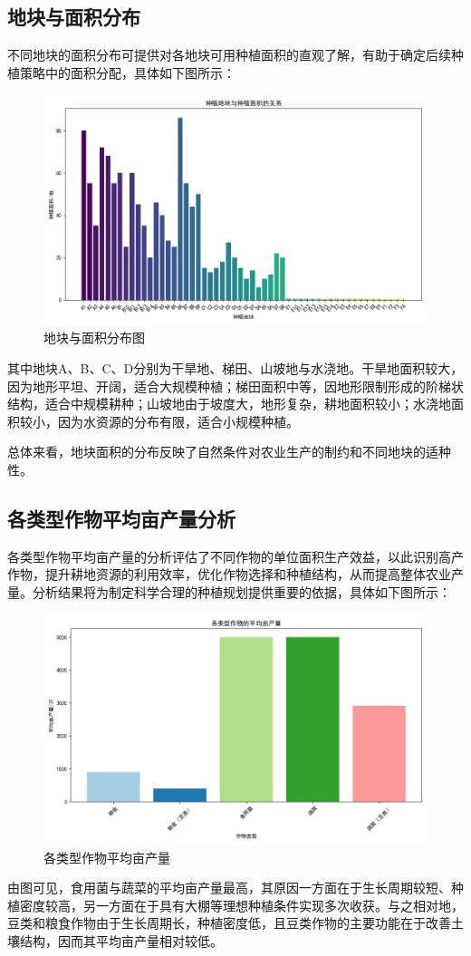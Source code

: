\documentclass{cumcmthesis}
\begin{document}
\subsection{地块与面积分布}
不同地块的面积分布可提供对各地块可用种植面积的直观了解，有助于确定后续种植策略中的面积分配，具体如下图所示：
\begin{figure}[H]
    \centering
    \includegraphics[width=.9\textwidth]{Figure_1.png}
    \caption{地块与面积分布图}
    \label{fig:region_area}
\end{figure}
其中地块A、B、C、D分别为干旱地、梯田、山坡地与水浇地。干旱地面积较大，因为地形平坦、开阔，适合大规模种植；梯田面积中等，因地形限制形成的阶梯状结构，适合中规模耕种；山坡地由于坡度大，地形复杂，耕地面积较小；水浇地面积较小，因为水资源的分布有限，适合小规模种植。

总体来看，地块面积的分布反映了自然条件对农业生产的制约和不同地块的适种性。

\subsection{各类型作物平均亩产量分析}
各类型作物平均亩产量的分析评估了不同作物的单位面积生产效益，以此识别高产作物，提升耕地资源的利用效率，优化作物选择和种植结构，从而提高整体农业产量。分析结果将为制定科学合理的种植规划提供重要的依据，具体如下图所示：
\begin{figure}[H]
    \centering
    \includegraphics[width=.9\textwidth]{Figure_2.png}
    \caption{各类型作物平均亩产量}
    \label{fig:crop_yield}
\end{figure}
由图可见，食用菌与蔬菜的平均亩产量最高，其原因一方面在于生长周期较短、种植密度较高，另一方面在于具有大棚等理想种植条件实现多次收获。与之相对地，豆类和粮食作物由于生长周期长，种植密度低，且豆类作物的主要功能在于改善土壤结构，因而其平均亩产量相对较低。
\end{document}
